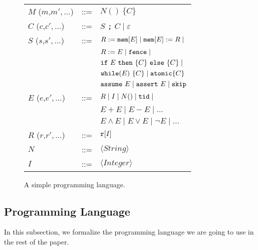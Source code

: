 \begin{figure}
{\small
\begin{tabular}{lcl}
$M$ ($m$,$m',\ldots$) & ::= & $N()\ \{ C \}$\\
$C$ ($c$,$c',\ldots$) & ::= & $S$ {\tt ;} $C \mid \varepsilon$\\
$S$ ($s$,$s',\ldots$) & ::= & $R := \mathtt{mem}[E] \mid \mathtt{mem}[E] := R \mid$\\
& &  $R := E \mid \mathtt{fence} \mid$\\
& & $\mathtt{if}\ E\ \mathtt{then}\ \{C\}\ \mathtt{else}\ \{C\}\mid$\\ 
& & $\mathtt{while}(E)\ \{C\}\mid \mathtt{atomic}\{C\}$\\
& & $\mathtt{assume}\ E \mid \mathtt{assert}\ E \mid \mathtt{skip}$\\
$E$ ($e$,$e',\ldots$) & ::= & $R \mid I \mid N() \mid \mathtt{tid} \mid$\\
& & $E+E \mid E-E \mid \ldots$\\
& & $E\wedge E \mid E\vee E \mid \neg E \mid \ldots $\\
$R$ ($r$,$r',\ldots$) & ::= & $\mathtt{r}[I]$\\
$N$ & ::= & $\langle String\rangle$\\
$I$ & ::= & $\langle Integer\rangle$
\end{tabular}
}
\label{fig:program-grammar}
\caption{A simple programming language.}
\end{figure}

\newcommand{\aliprogstmt}{\ensuremath{\mathsf{Stmt}}}
\newcommand{\aliprogstmtx}[1]{\ensuremath{\aliprogstmt(#1)}}
\newcommand{\alilabel}{\ensuremath{\mathsf{Lab}}}
\newcommand{\alilabelx}[1]{\ensuremath{\alilabel(#1)}}

\subsection{Programming Language}
\label{subsec:programming-language}
In this subsection, we formalize the programming language we are going to use in the rest of the paper.

